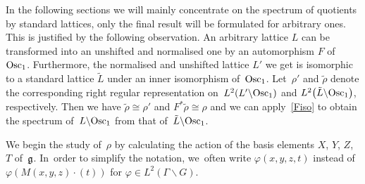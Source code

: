 \documentclass[10pt,a4paper]{amsart}
\newcommand\fg{{\frak{g}}}
\newcommand\ph{\varphi}
\newcommand{\Osc}{{\rm Osc}}
\numberwithin{equation}{section}
\begin{document}
In the following sections we will mainly concentrate on the spectrum of quotients by standard lattices, only the final result will be formulated for arbitrary ones. This is justified by the following observation. An arbitrary lattice $L$ can be transformed into an unshifted and normalised one by an automorphism $F$ of~$\Osc_1$. Furthermore, the normalised and unshifted lattice $L'$ we get is isomorphic to a standard lattice $\tilde L$ under an inner isomorphism of~$\Osc_1$. Let~$\rho'$ and $\tilde \rho$ denote the corresponding right regular representation on~$L^2(L'\backslash \Osc_1)$ and $L^2\big(\tilde L\backslash \Osc_1\big)$, respectively. Then we have $\tilde\rho\cong \rho'$ and $F^*\tilde \rho\cong\rho$
and we can apply~\eqref{Fiso} to obtain the spectrum of~$L\backslash \Osc_1$ from that of~$\tilde L\backslash \Osc_1$.

We begin the study of~$\rho$ by calculating the action of the basis elements $X$, $Y$, $Z$, $T$ of~$\fg$. In~order to simplify the notation, we~often write $\ph(x,y,z,t)$ instead of~$\ph(M(x,y,z)\cdot(t))$ for $\ph\in L^2(\Gamma\backslash G)$.
\end{document}
